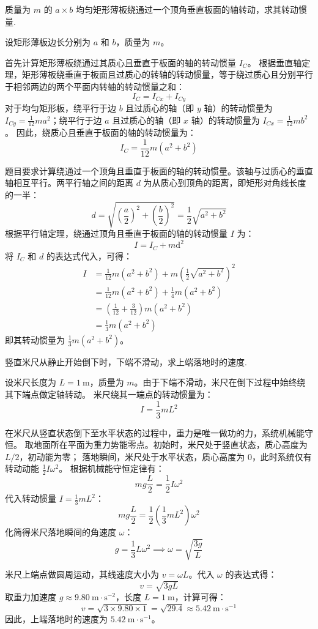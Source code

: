 \begin{exercise}\label{ex:6.1}
质量为 $m$ 的 $a \times b$ 均匀矩形薄板绕通过一个顶角垂直板面的轴转动，求其转动惯量.
\end{exercise}
\begin{solution}
设矩形薄板边长分别为 $a$ 和 $b$，质量为 $m$。

首先计算矩形薄板绕通过其质心且垂直于板面的轴的转动惯量 $I_C$。
根据垂直轴定理，矩形薄板绕垂直于板面且过质心的转轴的转动惯量，等于绕过质心且分别平行于相邻两边的两个平面内转轴的转动惯量之和：
$$ I_C = I_{Cx} + I_{Cy} $$
对于均匀矩形板，绕平行于边 $b$ 且过质心的轴（即 $y$ 轴）的转动惯量为 $I_{Cy} = \frac{1}{12} m a^2$；绕平行于边 $a$ 且过质心的轴（即 $x$ 轴）的转动惯量为 $I_{Cx} = \frac{1}{12} m b^2$。
因此，绕质心且垂直于板面的轴的转动惯量为：
$$ I_C = \frac{1}{12} m (a^2 + b^2) $$

题目要求计算绕通过一个顶角且垂直于板面的轴的转动惯量。该轴与过质心的垂直轴相互平行。两平行轴之间的距离 $d$ 为从质心到顶角的距离，即矩形对角线长度的一半：
$$ d = \sqrt{ \left(\frac{a}{2}\right)^2 + \left(\frac{b}{2}\right)^2 } = \frac{1}{2} \sqrt{a^2 + b^2} $$
根据平行轴定理，绕通过顶角且垂直于板面的轴的转动惯量 $I$ 为：
$$ I = I_C + m \mathrm{d}^2 $$
将 $I_C$ 和 $d$ 的表达式代入，可得：
\begin{align*}
    I &= \frac{1}{12} m (a^2 + b^2) + m \left( \frac{1}{2} \sqrt{a^2 + b^2} \right)^2 \\
      &= \frac{1}{12} m (a^2 + b^2) + \frac{1}{4} m (a^2 + b^2) \\
      &= \left( \frac{1}{12} + \frac{3}{12} \right) m (a^2 + b^2) \\
      &= \frac{1}{3} m (a^2 + b^2)
\end{align*}
即其转动惯量为 $\frac{1}{3} m(a^2 + b^2)$。
\end{solution}

\begin{exercise}\label{ex:6.2}
竖直米尺从静止开始倒下时，下端不滑动，求上端落地时的速度.
\end{exercise}
\begin{solution}
设米尺长度为 $L = 1 \ \mathrm{m}$，质量为 $m$。由于下端不滑动，米尺在倒下过程中始终绕其下端点做定轴转动。
米尺绕其一端点的转动惯量为：
$$ I = \frac{1}{3} m L^2 $$

在米尺从竖直状态倒下至水平状态的过程中，重力是唯一做功的力，系统机械能守恒。
取地面所在平面为重力势能零点。初始时，米尺处于竖直状态，质心高度为 $L/2$，初动能为零；
落地瞬间，米尺处于水平状态，质心高度为 $0$，此时系统仅有转动动能 $\frac{1}{2} I \omega^2$。
根据机械能守恒定律有：
$$ m g \frac{L}{2} = \frac{1}{2} I \omega^2 $$
代入转动惯量 $I = \frac{1}{3} m L^2$：
$$ m g \frac{L}{2} = \frac{1}{2} \left( \frac{1}{3} m L^2 \right) \omega^2 $$
化简得米尺落地瞬间的角速度 $\omega$：
$$ g = \frac{1}{3} L \omega^2 \implies \omega = \sqrt{\frac{3g}{L}} $$

米尺上端点做圆周运动，其线速度大小为 $v = \omega L$。代入 $\omega$ 的表达式得：
$$ v = \sqrt{3gL} $$
取重力加速度 $g \approx 9.80 \ \mathrm{m \cdot s^{-2}}$，长度 $L = 1 \ \mathrm{m}$，计算可得：
$$ v = \sqrt{3 \times 9.80 \times 1} = \sqrt{29.4} \approx 5.42 \ \mathrm{m \cdot s^{-1}} $$
因此，上端落地时的速度为 $5.42 \ \mathrm{m \cdot s^{-1}}$。
\end{solution}

